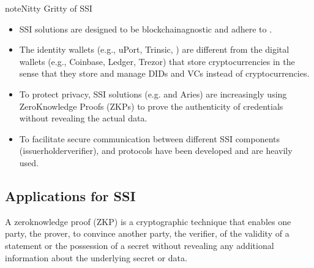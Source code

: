 \documentclass[letterpaper,10pt,english]{jupyterBook}
\begin{document}
\begin{sphinxadmonition}{note}{Nitty Gritty of SSI}
\begin{itemize}
\item {} 
\sphinxAtStartPar
SSI solutions are designed to be blockchain\sphinxhyphen{}agnostic and adhere to .

\item {} 
\sphinxAtStartPar
The identity wallets (e.g., uPort, Trinsic, ) are different from the digital wallets (e.g., Coinbase, Ledger, Trezor) that store cryptocurrencies in the sense that they store and manage DIDs and VCs instead of cryptocurrencies.

\item {} 
\sphinxAtStartPar
To protect privacy, SSI solutions (e.g. \sphinxhyphen{}  and Aries) are increasingly using Zero\sphinxhyphen{}Knowledge Proofs (ZKPs) to prove the authenticity of credentials without revealing the actual data.

\item {} 
\sphinxAtStartPar
To facilitate secure communication between different SSI components (issuer\sphinxhyphen{}holder\sphinxhyphen{}verifier),  and  protocols have been developed and are heavily used.

\end{itemize}
\end{sphinxadmonition}


\subsection{Applications for SSI}
\label{\detokenize{SSI/ssi:applications-for-ssi}}
\begin{sphinxShadowBox}

\sphinxAtStartPar
A zero\sphinxhyphen{}knowledge proof (ZKP) is a cryptographic technique that enables one party, the prover, to convince another party, the verifier, of the validity of a statement or the possession of a secret without revealing any additional information about the underlying secret or data.
\end{sphinxShadowBox}
\end{document}
